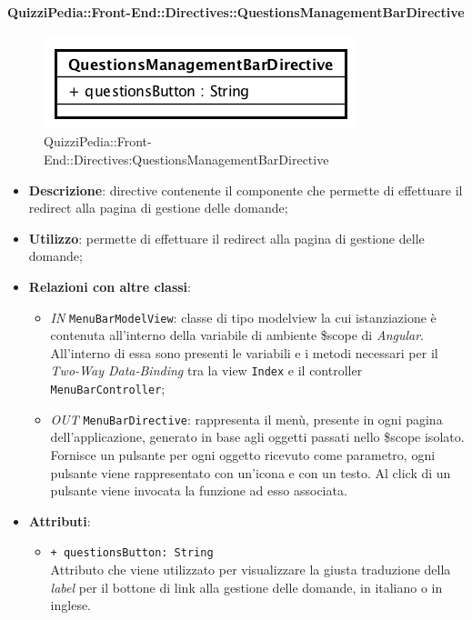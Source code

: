 \paragraph[QuizziPedia::Front-End::Directives\\::QuestionsManagementBarDirective]{QuizziPedia::Front-End::Directives::QuestionsManagementBarDirective}

\label{QuizziPedia::Front-End::Directives::QuestionsManagementBarDirective}
\begin{figure} [ht]
	\centering
	\includegraphics[scale=0.80]{UML/Classi/Front-End/QuizziPedia_Front-end_Directives_QuestionsManagementBarDirective.png}
	\caption{QuizziPedia::Front-End::Directives:QuestionsManagementBarDirective}
\end{figure} \FloatBarrier
\begin{itemize}
	\item \textbf{Descrizione}: directive contenente il componente che permette di effettuare il redirect alla pagina di gestione delle domande;
	\item \textbf{Utilizzo}: permette di effettuare il redirect alla pagina di gestione delle domande;
	\item \textbf{Relazioni con altre classi}:
	\begin{itemize}
		\item \textit{IN} \texttt{MenuBarModelView}: classe di tipo modelview la cui istanziazione è contenuta all'interno della variabile di ambiente \$scope di \textit{Angular}. All'interno di essa sono presenti le variabili e i metodi necessari per il \textit{Two-Way Data-Binding} tra la view \texttt{Index} e il controller \texttt{MenuBarController};
		\item \textit{OUT} \texttt{MenuBarDirective}: rappresenta il menù, presente in ogni pagina dell'applicazione, generato in base agli oggetti passati nello \$scope isolato. Fornisce un pulsante per ogni oggetto ricevuto come parametro, ogni pulsante viene rappresentato con un’icona e con un testo. Al click di un pulsante viene invocata la funzione ad esso associata.  
	\end{itemize}
	\item \textbf{Attributi}:
	\begin{itemize}
		\item \texttt{+ questionsButton: String} \\ Attributo che viene utilizzato per visualizzare la giusta traduzione della \textit{label} per il bottone di link alla gestione delle domande, in italiano o in inglese.
	\end{itemize}
\end{itemize}